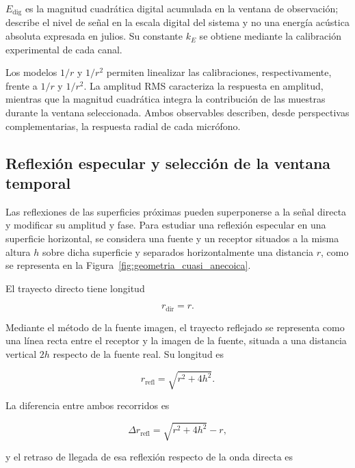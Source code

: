 $E_{\mathrm{dig}}$ es la magnitud cuadrática digital acumulada en la
ventana de observación; describe el nivel de señal en la escala digital
del sistema y no una energía acústica absoluta expresada en julios.
Su constante $k_E$ se obtiene mediante la calibración experimental de
cada canal.

Los modelos $1/r$ y $1/r^2$ permiten linealizar las calibraciones,
respectivamente, frente a $1/r$ y $1/r^2$. La amplitud RMS caracteriza
la respuesta en amplitud, mientras que la magnitud cuadrática integra
la contribución de las muestras durante la ventana seleccionada. Ambos
observables describen, desde perspectivas complementarias, la respuesta
radial de cada micrófono.

\subsection{Reflexión especular y selección de la ventana temporal}

Las reflexiones de las superficies próximas pueden superponerse a la
señal directa y modificar su amplitud y fase. Para estudiar una reflexión
especular en una superficie horizontal, se considera una fuente y un
receptor situados a la misma altura $h$ sobre dicha superficie y
separados horizontalmente una distancia $r$, como se representa en la
Figura~\ref{fig:geometria_cuasi_anecoica}.

El trayecto directo tiene longitud

\begin{equation}
    r_{\mathrm{dir}} = r.
    \label{eq:trayecto_directo}
\end{equation}

Mediante el método de la fuente imagen, el trayecto reflejado se
representa como una línea recta entre el receptor y la imagen de la
fuente, situada a una distancia vertical $2h$ respecto de la fuente
real. Su longitud es

\begin{equation}
    r_{\mathrm{refl}} = \sqrt{r^2+4h^2}.
    \label{eq:trayecto_reflejado}
\end{equation}

La diferencia entre ambos recorridos es

\begin{equation}
    \Delta r_{\mathrm{refl}} =
    \sqrt{r^2+4h^2}-r,
    \label{eq:delta_r_refl}
\end{equation}

y el retraso de llegada de esa reflexión respecto de la onda directa es

